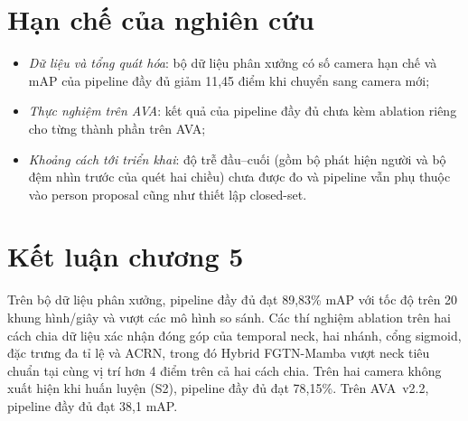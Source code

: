 \section{Hạn chế của nghiên cứu}
\label{sec:limitations}

\begin{itemize}
  \item \emph{Dữ liệu và tổng quát hóa}: bộ dữ liệu phân xưởng có số camera hạn chế và mAP của pipeline đầy đủ giảm 11,45 điểm khi chuyển sang camera mới;
  \item \emph{Thực nghiệm trên AVA}: kết quả của pipeline đầy đủ chưa kèm ablation riêng cho từng thành phần trên AVA;
  \item \emph{Khoảng cách tới triển khai}: độ trễ đầu--cuối (gồm bộ phát hiện người và bộ đệm nhìn trước của quét hai chiều) chưa được đo và pipeline vẫn phụ thuộc vào person proposal cũng như thiết lập closed-set.
\end{itemize}

\section*{Kết luận chương 5}

Trên bộ dữ liệu phân xưởng, pipeline đầy đủ đạt 89,83\% mAP với tốc độ trên 20 khung hình/giây và vượt các mô hình so sánh. Các thí nghiệm ablation trên hai cách chia dữ liệu xác nhận đóng góp của temporal neck, hai nhánh, cổng sigmoid, đặc trưng đa tỉ lệ và ACRN, trong đó Hybrid FGTN-Mamba vượt neck tiêu chuẩn tại cùng vị trí hơn 4 điểm trên cả hai cách chia. Trên hai camera không xuất hiện khi huấn luyện (S2), pipeline đầy đủ đạt 78,15\%. Trên AVA~v2.2, pipeline đầy đủ đạt 38,1 mAP.
